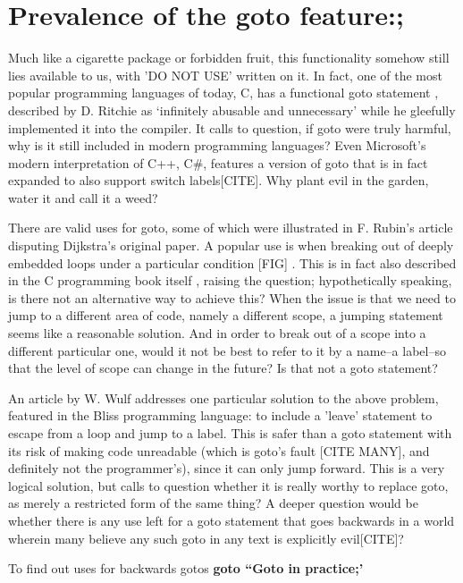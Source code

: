 \documentclass{journal}
\begin{document}
\section{Prevalence of the goto feature:;}
Much like a cigarette package or forbidden fruit, this functionality somehow still lies available to us, with 'DO NOT USE' written on it.  In fact, one of the most popular programming languages of today, C, has a functional goto statement \cite{cprogramming}, described by D. Ritchie as `infinitely abusable and unnecessary' \cite{cprogramming} while he gleefully implemented it into the compiler. It calls to question, if goto were truly harmful, why is it still included in modern programming languages? Even Microsoft's modern interpretation of C++, C\#, features a version of goto that is in fact expanded to also support switch labels[CITE]. Why plant evil in the garden, water it and call it a weed?

There are valid uses for goto, some of which were illustrated in F. Rubin's article \cite{gotoodeep} disputing Dijkstra's original paper. A popular use is when breaking out of deeply embedded loops under a particular condition [FIG] \cite{gotoodeep}. This is in fact also described in the C programming book itself \cite{cprogramming}, raising the question; hypothetically speaking, is there not an alternative way to achieve this? When the issue is that we need to jump to a different area of code, namely a different scope, a jumping statement seems like a reasonable solution. And in order to break out of a scope into a different particular one, would it not be best to refer to it by a name--a label--so that the level of scope can change in the future? Is that not a goto statement?

An article by W. Wulf \cite{againstgoto} addresses one particular solution to the above problem, featured in the Bliss programming language: to include a 'leave' statement to escape from a loop and jump to a label. This is safer than a goto statement with its risk of making code unreadable (which is goto's fault [CITE MANY], and definitely not the programmer's), since it can only jump forward. This is a very logical solution, but calls to question whether it is really worthy to replace goto, as merely a restricted form of the same thing? A deeper question would be whether there is any use left for a goto statement that goes backwards in a world wherein many believe any such goto in any text is explicitly evil[CITE]?

To find out uses for backwards gotos \textbf{goto ``Goto in practice;'}
\end{document}

